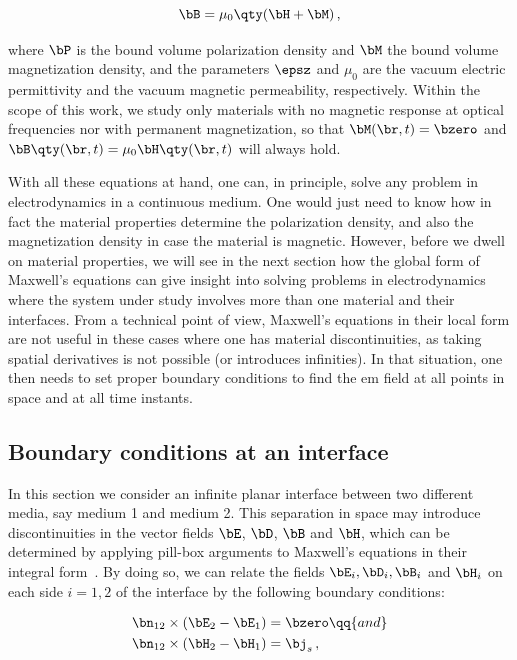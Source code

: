 \begin{equation}
    \label{eq:constitutive_relation_magnetic_field}
    \bB = \mu_0 \qty(\bH + \bM)\,,
\end{equation}

\noindent where $\bP$ is the bound volume polarization density and $\bM$ the bound volume magnetization density, and the parameters $\epsz$ and $\mu_0$ are the vacuum electric permittivity and the vacuum magnetic permeability, respectively.
Within the scope of this work, we study only materials with no magnetic response at optical frequencies nor with permanent magnetization, so that $\bM(\br,t) = \bzero$ and $\bB \qty(\br,t)  = \mu_0 \bH \qty(\br,t)$ will always hold.

With all these equations at hand, one can, in principle, solve any problem in electrodynamics in a continuous medium.
One would just need to know how in fact the material properties determine the polarization density, and also the magnetization density in case the material is magnetic.
However, before we dwell on material properties, we will see in the next section how the global form of Maxwell's equations can give insight into solving problems in electrodynamics where the system under study involves more than one material and their interfaces.
From a technical point of view, Maxwell's equations in their local form are not useful in these cases where one has material discontinuities, as taking spatial derivatives is not possible (or introduces infinities).
In that situation, one then needs to set proper boundary conditions to find the \gls{em} field at all points in space and at all time instants.

\subsection{Boundary conditions at an interface}
\label{subsec:boundary_conditions}

In this section we consider an infinite planar interface between two different media, say medium 1 and medium 2.
This separation in space may introduce discontinuities in the vector fields $\bE$, $\bD$, $\bB$ and $\bH$, which can be determined by applying pill-box arguments to Maxwell's equations in their integral form~\cite{Jackson:electrodynamics,Griffiths_2023}.
By doing so, we can relate the fields $\bE_i,\bD_i,\bB_i$ and $\bH_i$ on each side $i=1,2$ of the interface by the following boundary conditions:

\begin{subequations}
    \label{eq:boundary_conditions_tangential}
    \begin{align}
        \bn_{12} \times (\bE_2 - \bE_1) &= \bzero \label{eq:boundary_condition_E} \qq{and} \\
        \bn_{12} \times (\bH_2 - \bH_1) &= \bj_s\,, \label{eq:boundary_condition_H}
    \end{align}
\end{subequations}


